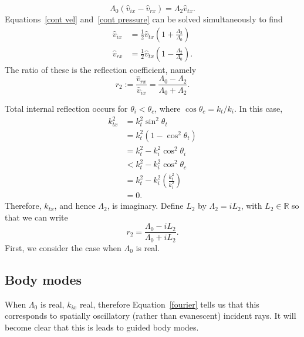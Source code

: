 \documentclass[12pt]{../style-files/ociamthesis}
\begin{document}
	\begin{equation}
	\Lambda_0(\hat{v}_{ix} - \hat{v}_{rx}) = \Lambda_2 \hat{v}_{tx}. \label{cont pressure}
	\end{equation}
	Equations~\eqref{cont vel} and~\eqref{cont pressure} can be solved simultaneously to find
	\begin{align}
	\hat{v}_{ix} &= \frac{1}{2}\hat{v}_{tx}\left(1 + \frac{\Lambda_2}{\Lambda_0}\right) \\
	\hat{v}_{rx} &= \frac{1}{2}\hat{v}_{tx}\left(1 - \frac{\Lambda_2}{\Lambda_0}\right).
	\end{align}
	The ratio of these is the reflection coefficient, namely
	\begin{equation}
	r_2 := \frac{\hat{v}_{rx}}{\hat{v}_{ix}} = \frac{\Lambda_0 - \Lambda_2}{\Lambda_0 + \Lambda_2}. \label{reflection coefficient}
	\end{equation}
	
	Total internal reflection occurs for $\theta_i < \theta_c$, where $\cos{\theta_c} = k_t / k_i$. In this case,
	\begin{align}
	k_{tx}^2 &= k_t^2 \sin^2{\theta_t} \\
	&= k_t^2(1 - \cos^2{\theta_t}) \\
	&= k_t^2 - k_i^2\cos^2{\theta_i} \\
	&< k_t^2 - k_i^2\cos^2{\theta_c} \\
	&= k_t^2 - k_i^2 \left(\frac{k_t^2}{k_i^2}\right) \\
	&= 0.
	\end{align}
	Therefore, $k_{tx}$, and hence $\Lambda_2$, is imaginary. Define $L_2$ by $\Lambda_2 = i L_2$, with $L_2 \in \mathbb{R}$ so that we can write
	\begin{equation}
	r_2 = \frac{\Lambda_0 - iL_2}{\Lambda_0 + iL_2}. \label{reflection coefficient 2}
	\end{equation}
	First, we consider the case when $\Lambda_0$ is real.
	
	
	\subsection{Body modes}
	When $\Lambda_0$ is real, $k_{ix}$ real, therefore Equation~\eqref{fourier} tells us that this corresponds to spatially oscillatory (rather than evanescent) incident rays. It will become clear that this is leads to guided body modes.
	
\end{document}
